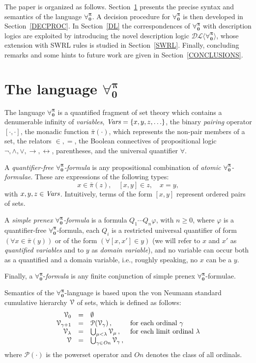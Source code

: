 \documentclass[a4paper,UKenglish]{lipics}
\newcommand{\Lang}{\ensuremath{\mathbf{\forall_{0}^{\pi}}}\xspace}
\newcommand{\nonpairs}[1]{\bar{\pi}(#1)}
\newcommand{\dlLang}{\ensuremath{\mathcal{DL\langle}\Lang\mathcal{\rangle}}\xspace}
\begin{document}
The paper is organized as follows.  Section~\ref{LANG} presents the
precise syntax and semantics of the language \Lang.  A decision
procedure for \Lang is then developed in Section~\ref{DECPROC}.  In
Section~\ref{DL} the correspondences of \Lang with description logics
are exploited by introducing the novel description logic \dlLang,
whose extension with \textsf{SWRL} rules is studied in Section~\ref{SWRL}.
Finally, concluding remarks and some hints to future work are given in
Section~\ref{CONCLUSIONS}.

\section{The language \Lang}\label{LANG}
The language \Lang is a quantified fragment of set theory which
contains a denumerable infinity of \emph{variables}, $\mathit{Vars} = \{x, y,
z, \ldots \}$, the binary \emph{pairing} operator $[\cdot,\cdot]$, the
monadic function $\nonpairs{\cdot}$, which represents the non-pair
members of a set, the relators $\in, =$, the Boolean connectives of
propositional logic $\neg, \wedge, \vee, \rightarrow,
\leftrightarrow$, parentheses, and the universal quantifier
$\forall$.

A \emph{quantifier-free \Lang-formula} is any propositional
combination of \emph{atomic \Lang-formulae}.  These are expressions of
the following types:
\begin{equation}\label{ATOMICFORMULAE}
    x \in \nonpairs{z},\quad [x,y] \in z,\quad x=y,
\end{equation}
with $x,y,z \in \mathit{Vars}$.  Intuitively, terms of the form $[x,y]$
represent ordered pairs of sets.

A \emph{simple prenex \Lang-formula} is a formula $Q_1\cdots Q_n
\varphi$, with $n \geq 0$, where $\varphi$ is a quantifier-free
\Lang-formula, each $Q_i$ is a restricted universal quantifier of form
$(\forall x \in \nonpairs{y})$ or of the form $(\forall [x,x'] \in y)$
(we will refer to $x$ and $x'$ as \emph{quantified variables} and to
$y$ as \emph{domain variable}), and no variable can occur both as a
quantified and a domain variable, i.e., roughly speaking, no $x$ can
be a $y$.

Finally, a \Lang-\emph{formula} is any finite conjunction of simple
prenex \Lang-formulae.

Semantics of the \Lang-language is based upon the von Neumann
standard cumulative hierarchy $\mathcal{V}$ of sets, which is
defined as follows:
\[
\begin{array}{rcll}
  \mathcal{V}_0          & = & \emptyset
\\
  \mathcal{V}_{\gamma+1} & = & \mathcal{P}(\mathcal{V}_\gamma) \,,
  & \textrm{for each ordinal $\gamma$}
\\
  \mathcal{V}_\lambda    & = & \bigcup_{\mu < \lambda} \mathcal{V}_\mu
  \,,& \textrm{for each limit ordinal $\lambda$}
\\
  \mathcal{V} & = & \bigcup_{\gamma \in \mathit{On}} \mathcal{V}_{\gamma} \,,
\end{array}
\]
where $\mathcal{P}(\cdot)$ is the powerset operator and
$\mathit{On}$ denotes the class of all ordinals.
\end{document}
